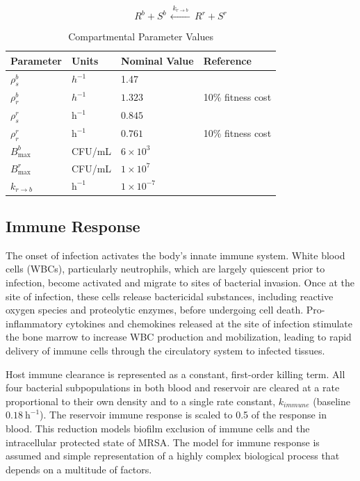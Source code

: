 \documentclass[utf8]{FrontiersinHarvard} %
\begin{document}
\begin{equation}
R^{b} + S^{b}
\,
\xleftarrow{\;k_{r \to b}\;}
\,
R^{r} + S^{r}
\end{equation}

\begin{table}[H]
\centering
\renewcommand{\arraystretch}{1.35}
\caption{Compartmental Parameter Values}\label{tab:Comparsms}
\vspace{0.5cm}
\begin{tabular}{l l l l}
\hline
\textbf{Parameter} & \textbf{Units} & \textbf{Nominal Value} & \textbf{Reference} \\
\hline
$\rho_s^{b}$ & $h^{-1}$ & 1.47 & \citealp{VeraYunca2025}\\
$\rho_r^{b}$ & $h^{-1}$ & $1.323$ &  10\% fitness cost  \\
$\rho_{s}^{r}$         & $\text{h}^{-1}$     & $0.845$             & \citealp{VeraYunca2025} \\
$\rho_{r}^{r}$         & $\text{h}^{-1}$     & $0.761$             & 10\% fitness cost\\
$B_{\max}^{b}$ & CFU/mL & $6 \times 10^3$ & \citealp{nieman2022bacterial} \\
$B_{\max}^{r}$         & CFU/mL              & $1 \times 10^{7}$   & \citealp{VeraYunca2025}\\
$k_{r \to b}$          & $\text{h}^{-1}$     & $1 \times 10^{-7}$ & \citealp{Kostakioti2013} \\
\hline
\end{tabular}
\end{table}

\subsection{Immune Response}
The onset of infection activates the body's innate immune system. White blood cells (WBCs), particularly
neutrophils, which are largely quiescent prior to infection, become activated and migrate to sites of bacterial invasion.
Once at the site of infection, these cells release bactericidal substances, including reactive oxygen species and proteolytic enzymes,
before undergoing cell death. Pro-inflammatory cytokines and chemokines released at the site of infection stimulate
the bone marrow to increase WBC production and mobilization, leading to rapid delivery of immune cells through the circulatory
system to infected tissues.

Host immune clearance is represented as a constant, first-order killing
term. All four bacterial subpopulations in both blood and
reservoir are cleared at a rate proportional to their own density and to
a single rate constant, $k_{immune}$ (baseline $0.18~\mathrm{h^{-1}}$).
The reservoir immune response is scaled to 0.5 of the response in blood. This
reduction models biofilm exclusion of immune cells and the intracellular protected state of MRSA.
The model for immune response is assumed and simple representation
of a highly complex biological process that depends on a multitude of factors.
\end{document}
